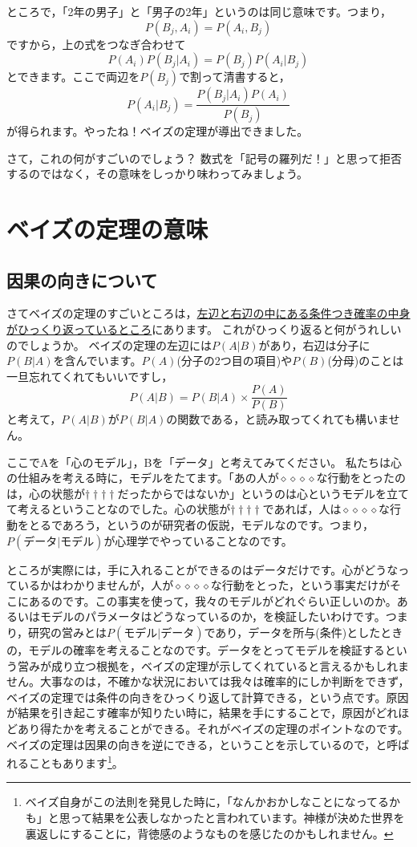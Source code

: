 \documentclass{ltjbook}
\begin{document}
ところで，「2年の男子」と「男子の2年」というのは同じ意味です。つまり，
\[P(B_j,A_i) = P(A_i, B_j) \]
ですから，上の式をつなぎ合わせて
\[P(A_i)P(B_j|A_i) = P(B_j)P(A_i|B_j) \]
とできます。ここで両辺を$P(B_j)$で割って清書すると，
\[ P(A_i | B_j )=\frac{P(B_j|A_i)P(A_i)}{P(B_j)} \]
が得られます。やったね！ベイズの定理が導出できました。


さて，これの何がすごいのでしょう？ 数式を「記号の羅列だ！」と思って拒否するのではなく，その意味をしっかり味わってみましょう。

\section{ベイズの定理の意味}
\subsection{因果の向きについて}
さてベイズの定理のすごいところは，\underline{左辺と右辺の中にある条件つき確率の中身がひっくり返っているところ}にあります。
これがひっくり返ると何がうれしいのでしょうか。
ベイズの定理の左辺には$P(A|B)$があり，右辺は分子に$P(B|A)$を含んでいます。$P(A)$(分子の2つ目の項目)や$P(B)$(分母)のことは一旦忘れてくれてもいいですし，
\[ P(A|B) = P(B|A) \times \frac{P(A)}{P(B)}\]
と考えて，$P(A|B)$が$P(B|A)$の関数である，と読み取ってくれても構いません。

ここでAを「心のモデル」，Bを「データ」と考えてみてください。
私たちは心の仕組みを考える時に，モデルをたてます。「あの人が$\diamond\diamond\diamond\diamond$な行動をとったのは，心の状態が$\dagger\dagger\dagger\dagger$だったからではないか」というのは心というモデルを立てて考えるということなのでした。心の状態が$\dagger\dagger\dagger\dagger$であれば，人は$\diamond\diamond\diamond\diamond$な行動をとるであろう，というのが研究者の仮説，モデルなのです。つまり，$P(\mbox{データ}|\mbox{モデル})$が心理学でやっていることなのです。

ところが実際には，手に入れることができるのはデータだけです。心がどうなっているかはわかりませんが，人が$\diamond\diamond\diamond\diamond$な行動をとった，という事実だけがそこにあるのです。この事実を使って，我々のモデルがどれぐらい正しいのか。あるいはモデルのパラメータはどうなっているのか，を検証したいわけです。つまり，研究の営みとは$P(\mbox{モデル}|\mbox{データ})$であり，データを所与(条件)としたときの，モデルの確率を考えることなのです。データをとってモデルを検証するという営みが成り立つ根拠を，ベイズの定理が示してくれていると言えるかもしれません。大事なのは，不確かな状況においては我々は確率的にしか判断をできず，ベイズの定理では条件の向きをひっくり返して計算できる，という点です。原因が結果を引き起こす確率が知りたい時に，結果を手にすることで，原因がどれほどあり得たかを考えることができる。それがベイズの定理のポイントなのです。ベイズの定理は因果の向きを逆にできる，ということを示しているので，と呼ばれることもあります\footnote{ベイズ自身がこの法則を発見した時に，「なんかおかしなことになってるかも」と思って結果を公表しなかったと言われています。神様が決めた世界を裏返しにすることに，背徳感のようなものを感じたのかもしれません。}。
\end{document}
